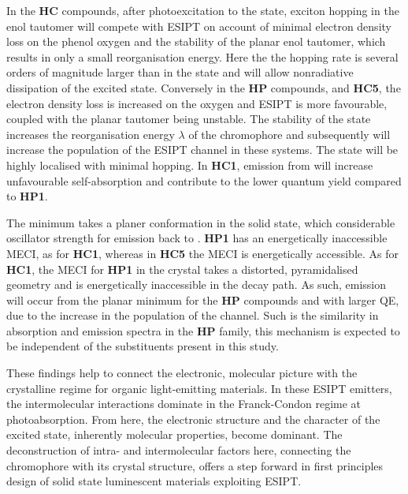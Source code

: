 In the \textbf{HC} compounds, after photoexcitation to the \sone{} state, exciton hopping in the enol tautomer will compete with ESIPT on account of minimal electron density loss on the phenol oxygen and the stability of the planar enol tautomer, which results in only a small reorganisation energy. Here the the hopping rate is several orders of magnitude larger than in the \Kstar{} state and will allow nonradiative dissipation of the excited state. Conversely in the \textbf{HP} compounds, and \textbf{HC5}, the electron density loss is increased on the oxygen and ESIPT is more favourable, coupled with the planar \Estar{} tautomer being unstable. The stability of the \Kstar{} state increases the reorganisation energy $\lambda$ of the chromophore and subsequently will increase the population of the ESIPT channel in these systems. The \Kstar{} state will be highly localised with minimal hopping. In \textbf{HC1}, emission from \Estar{} will increase unfavourable self-absorption and contribute to the lower quantum yield compared to \textbf{HP1}.

The \Kstar{} minimum takes a planer conformation in the solid state, which considerable oscillator strength for emission back to \szero{}. \textbf{HP1} has an energetically inaccessible MECI, as for \textbf{HC1}, whereas in \textbf{HC5} the MECI is energetically accessible. As for \textbf{HC1}, the MECI for \textbf{HP1} in the crystal takes a distorted, pyramidalised geometry and is energetically inaccessible in the decay path. As such, emission will occur from the planar \Kstar{} minimum for the \textbf{HP} compounds and with larger QE, due to the increase in the population of the \Kstar{} channel. Such is the similarity in absorption and emission spectra in the \textbf{HP} family, this mechanism is expected to be independent of the substituents present in this study. 

These findings help to connect the electronic, molecular picture with the crystalline regime for organic light-emitting materials. In these ESIPT emitters, the intermolecular interactions dominate in the Franck-Condon regime at photoabsorption. From here, the electronic structure and the character of the excited state, inherently molecular properties, become dominant. The deconstruction of intra- and intermolecular factors here, connecting the chromophore with its crystal structure, offers a step forward in first principles design of solid state luminescent materials exploiting ESIPT.
